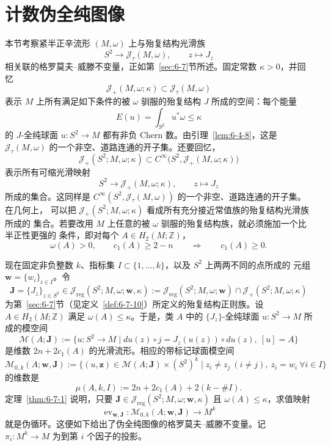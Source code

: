 
\section{计数伪全纯图像}\label{sec:7-3}

本节考察紧半正辛流形 $(M,\omega)$ 上与殆复结构光滑族
\[
  S^2\longrightarrow\mathcal J_\tau(M,\omega),
  \qquad z\longmapsto J_z
\]
相关联的格罗莫夫--威滕不变量，正如第~\ref{sec:6-7}节所述。固定常数
$\kappa>0$，并回忆
\[
  \mathcal J_+(M,\omega;\kappa)\subset\mathcal J_\tau(M,\omega)
\]
表示 $M$ 上所有满足如下条件的被 $\omega$ 驯服的殆复结构 $J$ 所成的空间：每个能量
\[
  E(u)=\int_{S^2}u^*\omega\le\kappa
\]
的 $J$-全纯球面 $u:S^2\to M$ 都有非负 Chern 数。由引理~\ref{lem:6-4-8}，这是
$\mathcal J_\tau(M,\omega)$ 的一个非空、道路连通的开子集。还要回忆，
\[
  \mathcal J_+(S^2;M,\omega;\kappa)
  \subset C^\infty\bigl(S^2,\mathcal J_+(M,\omega;\kappa)\bigr)
\]
表示所有可缩光滑映射
\[
  S^2\longrightarrow\mathcal J_+(M,\omega;\kappa),
  \qquad z\longmapsto J_z
\]
所成的集合。这同样是
$C^\infty(S^2,\mathcal J_\tau(M,\omega))$ 的一个非空、道路连通的开子集。在几何上，
可以把 $\mathcal J_+(S^2;M,\omega;\kappa)$ 看成所有充分接近常值族的殆复结构光滑族所成的
集合。若要改用 $M$ 上任意的被 $\omega$ 驯服的殆复结构族，就必须施加一个比半正性更强的
条件，即对每个 $A\in H_2(M;\mathbb Z)$，
\[
  \omega(A)>0,\qquad c_1(A)\ge 2-n
  \qquad\Longrightarrow\qquad c_1(A)\ge0.
\]

现在固定非负整数 $k$、指标集 $I\subset\{1,\ldots,k\}$，以及 $S^2$ 上两两不同的点所成的
元组 $\mathbf w=\{w_i\}_{i\in I}$。令
\[
  \mathbf J=\{J_z\}_{z\in S^2}
  \in\mathcal J_{\mathrm{reg}}(S^2;M,\omega;\mathbf w,\kappa)
  :=\mathcal J_{\mathrm{reg}}(S^2;M,\omega;\mathbf w)
    \cap\mathcal J_+(S^2;M,\omega;\kappa)
\]
为第~\ref{sec:6-7}节（见定义~\ref{def:6-7-10}）所定义的殆复结构正则族。设
$A\in H_2(M;\mathbb Z)$ 满足 $\omega(A)\le\kappa$。于是，类 $A$ 中的
$\{J_z\}$-全纯球面 $u:S^2\to M$ 所成的模空间
\[
  \mathcal M(A;\mathbf J)
  :=\bigl\{u:S^2\to M\mid
  du(z)\circ j=J_z(u(z))\circ du(z),\ [u]=A\bigr\}
\]
是维数 $2n+2c_1(A)$ 的光滑流形。相应的带标记球面模空间
\[
  \mathcal M_{0,k}(A;\mathbf w,\mathbf J)
  :=\bigl\{(u,\mathbf z)\in\mathcal M(A;\mathbf J)\times(S^2)^k
  \mid z_i\ne z_j\ (i\ne j),\ z_i=w_i\ \forall i\in I\bigr\}
\]
的维数是
\[
  \mu(A,k,I):=2n+2c_1(A)+2(k-\#I).
\]
定理~\ref{thm:6-7-1} 说明，只要
$\mathbf J\in\mathcal J_{\mathrm{reg}}(S^2;M,\omega;\mathbf w,\kappa)$ 且
$\omega(A)\le\kappa$，求值映射
\[
  \operatorname{ev}_{\mathbf w,\mathbf J}:
  \mathcal M_{0,k}(A;\mathbf w,\mathbf J)\longrightarrow M^k
\]
就是伪循环。这便如下给出了伪全纯图像的格罗莫夫--威滕不变量。记
$\pi_i:M^k\to M$ 为到第 $i$ 个因子的投影。

